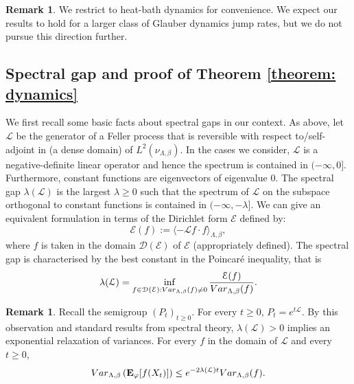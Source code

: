 \documentclass[11pt,a4paper]{article}
\theoremstyle{definition}
\newtheorem{remark}[theorem]{Remark}
\numberwithin{equation}{section}
\begin{document}
\begin{remark}
We restrict to heat-bath dynamics for convenience. We expect our results to hold for a larger class of Glauber dynamics jump rates, but we do not pursue this direction further.
\end{remark}



\subsection{Spectral gap and proof of Theorem \ref{theorem: dynamics}}



We first recall some basic facts about spectral gaps in our context. As above, let $\mathcal L$ be the generator of a Feller process that is reversible with respect to/self-adjoint in (a dense domain) of $L^2(\nu_{\Lambda,\beta})$. In the cases we consider, $\mathcal L$ is a negative-definite linear operator and hence the spectrum is contained in $(-\infty,0]$. Furthermore, constant functions are eigenvectors of eigenvalue $0$. The spectral gap $\lambda(\mathcal L)$ is the largest $\lambda \geq 0$ such that the spectrum of $\mathcal L$ on the subspace orthogonal to constant functions is contained in $(-\infty,-\lambda]$. We can give an equivalent formulation in terms of the Dirichlet form $\mathcal{E}$ defined by:
\begin{equation}
\mathcal E(f):= \langle -\mathcal L f \cdot f \rangle_{\Lambda,\beta},  
\end{equation}
where $f$ is taken in the domain $\mathcal{D}(\mathcal{E})$ of $\mathcal E$ (appropriately defined). The spectral gap is characterised by the best constant in the Poincaré inequality, that is 
\begin{equation}
    \lambda(\mathcal{L})=\inf_{f \in \mathcal{D}(\mathcal{E}): {\rm Var}_{\Lambda,\beta}(f)\neq 0}\frac{\mathcal{E}(f)}{{\rm Var}_{\Lambda,\beta}(f)}.
\end{equation}


\begin{remark}
Recall the semigroup $(P_t)_{t \geq 0}$. For every $t \geq 0$, $P_t = e^{t\mathcal L}$. By this observation and standard results from spectral theory, $\lambda(\mathcal{L})>0$ implies an exponential relaxation of variances. For every $f$ in the domain of $\mathcal L$ and every $t \geq 0$,
\begin{equation}
{\rm Var}_{\Lambda,\beta} \left( \mathbf E_\varphi[f(X_t)] \right) \leq e^{-2\lambda(\mathcal{L}) t} {\rm Var}_{\Lambda,\beta}(f).
\end{equation}
\end{remark}
\end{document}
